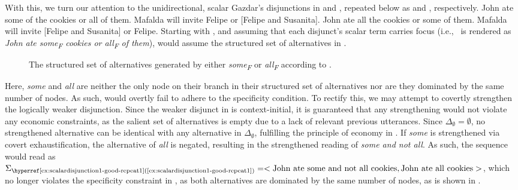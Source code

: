 With this, we turn our attention to the unidirectional, scalar Gazdar's disjunctions in  and , repeated below as  and , respectively.
\pex\label{ex:scalardisjunction-good-repeat1}
\a John ate some of the cookies or all of them.
\a Mafalda will invite Felipe or [Felipe and Susanita].
\xe
\pex\label{ex:scalardisjunction-bad-repeat1}
\a\ljudge{\#}John ate all the cookies or some of them.
\a\ljudge{\#}Mafalda will invite [Felipe and Susanita] or Felipe.
\xe
Starting with ,  and assuming that each disjunct's scalar term carries focus (i.e.,~ is rendered as \textit{John ate some\textsubscript{F} cookies or all\textsubscript{F} of them}), \textcite{Ippolito2020} would assume the structured set of alternatives in .
\begin{figure}[!htb]
    \centering\hspace{-6cm}
    
    \caption{The structured set of alternatives generated by either \textit{some\textsubscript{F}} or \textit{all\textsubscript{F}} according to \textcite{Ippolito2020}.}
\end{figure}
Here, \textit{some} and \textit{all} are neither the only node on their branch in their structured set of alternatives nor are they dominated by the same number of nodes. As such,  would overtly fail to adhere to the specificity condition. To rectify this, we may attempt to covertly strengthen the logically weaker disjunction. Since the weaker disjunct in  is context-initial, it is guaranteed that any strengthening would not violate any economic constraints, as the salient set of alternatives is empty due to a lack of relevant previous utterances. Since $\Delta_\emptyset=\emptyset$, no strengthened alternative can be identical with any alternative in $\Delta_\emptyset$, fulfilling the principle of economy in . If \textit{some} is strengthened via covert exhaustification, the alternative of \textit{all} is negated, resulting in the strengthened reading of \textit{some and not all}. As such, the sequence would read as $\Sigma_\text{\refex{scalardisjunction1-good-repeat1}}=<\text{{John ate some and not all cookies}},\text{{John ate all cookies}}>$, which no longer violates the specificity constraint in , as both alternatives are dominated by the same number of nodes, as is shown in .

